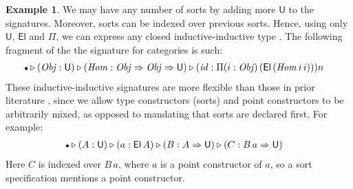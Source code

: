 \documentclass[12pt,a4paper,twoside,openany]{book}
\theoremstyle{remark}
\theoremstyle{definition}
\newtheorem{myexample}{Example}
\theoremstyle{theorem}
\newcommand{\mi}[1]{\mathit{#1}}
\newcommand{\U}{\mathsf{U}}
\newcommand{\El}{\mathsf{El}}
\newcommand{\ext}{\triangleright}
\newcommand{\emptycon}{\scaleobj{.75}\bullet}
\newcommand{\funi}{\Rightarrow}
\begin{document}
\begin{myexample}
We may have any number of sorts by adding more $\U$ to the signatures. Moreover,
sorts can be indexed over previous sorts. Hence, using only $\U$, $\El$ and
$\Pi$, we can express any closed inductive-inductive type
\cite{forsberg-phd}. The following fragment of the the signature for categories
is such:
\begin{alignat*}{3}
  & \emptycon \ext (\mi{Obj} : \U) \ext (\mi{Hom} : \mi{Obj} \funi \mi{Obj} \funi \U)
      \ext (\mi{id} : \Pi(i : \mi{Obj})\,(\El\,(\mi{Hom}\,i\,i)))n
\end{alignat*}
These inductive-inductive signatures are more flexible than those in prior
literature \cite{forsberg-phd}, since we allow type constructors (sorts) and
point constructors to be arbitrarily mixed, as opposed to mandating that sorts
are declared first. For example:
\begin{alignat*}{3}
  & \emptycon \ext (A : \U) \ext (a : \El\,A) \ext (B : A \funi \U) \ext (C : B\,a \funi \U)
\end{alignat*}
Here $C$ is indexed over $B\,a$, where $a$ is a point constructor of $a$, so a
sort specification mentions a point constructor.
\end{myexample}
\end{document}
